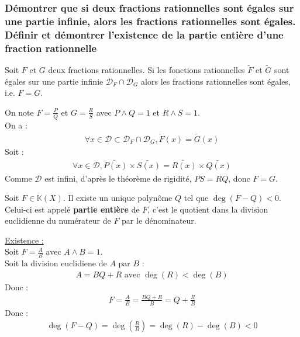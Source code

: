 \documentclass[titlepage, twoside]{report}
\begin{document}
\subsubsection{Démontrer que si deux fractions rationnelles sont égales sur une partie infinie, alors les fractions rationnelles sont égales. Définir et démontrer l'existence de la partie entière d'une fraction rationnelle}
\begin{tcolorbox}[title=Théorème 17.19, title filled=false, colframe=orange, colback=orange!10!white]
    Soit $F$ et $G$ deux fractions rationnelles. Si les fonctions rationnelles $\tilde F$ et $\tilde G$ sont égales sur une partie infinie $\mathcal D_F \cap \mathcal D_G$ alors les fractions rationnelles sont égales, i.e. $F = G$. 
\end{tcolorbox}

\noindent On note $F = \frac{P}{Q}$ et $G = \frac{R}{S}$ avec $P \wedge Q = 1$ et $R \wedge S = 1$. \\
On a : 
\begin{align*}
    \forall x \in \mathcal{D} \subset \mathcal{D}_F \cap \mathcal{D}_G, \tilde F(x) = \tilde G(x)
\end{align*}
Soit : 
\begin{align*}
    \forall x \in \mathcal{D}, \tilde{P(x)} \times \tilde{S(x)} = \tilde{R(x)} \times \tilde{Q(x)}
\end{align*}
Comme $\mathcal{D}$ est infini, d'après le théorème de rigidité, $PS = RQ$, donc $F = G$.

\begin{tcolorbox}[title=Théorème 17.25, title filled=false, colframe=orange, colback=orange!10!white]
    Soit $F \in \mathbb{K}(X)$. Il existe un unique polynôme $Q$ tel que $\deg(F - Q) < 0$. Celui-ci est appelé \textbf{partie entière} de $F$, c'est le quotient dans la division euclidienne du numérateur de $F$ par le dénominateur. 
\end{tcolorbox}

\noindent \underline{Existence :} \\
Soit $F = \frac{A}{B}$ avec $A \wedge B = 1$. \\
Soit la division euclidiene de $A$ par $B$ : 
\begin{align*}
    A = BQ + R \text{ avec } \deg(R) < \deg(B)
\end{align*}
Donc : 
\begin{align*}
    F = \frac{A}{B} = \frac{BQ + R}{B} = Q + \frac{R}{B}
\end{align*}
Donc : 
\begin{align*}
    \deg(F - Q) = \deg\left(\frac{R}{B}\right) = \deg(R) - \deg(B) < 0
\end{align*} \\
\end{document}
